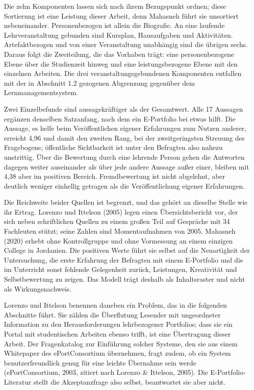 Die zehn Komponenten lassen sich nach ihrem Bezugspunkt ordnen; diese Sortierung ist eine Leistung dieser Arbeit, denn Mahasneh führt sie unsortiert nebeneinander. Personenbezogen ist allein die Biografie. An eine laufende Lehrveranstaltung gebunden sind Kursplan, Hausaufgaben und Aktivitäten. Artefaktbezogen und von einer Veranstaltung unabhängig sind die übrigen sechs. Daraus folgt die Zweiteilung, die das Vorhaben trägt: eine personenbezogene Ebene über die Studienzeit hinweg und eine leistungsbezogene Ebene mit den einzelnen Arbeiten. Die drei veranstaltungsgebundenen Komponenten entfallen mit der in Abschnitt 1.2 gezogenen Abgrenzung gegenüber dem Lernmanagementsystem.

Zwei Einzelbefunde sind aussagekräftiger als der Gesamtwert. Alle 17 Aussagen ergänzen denselben Satzanfang, nach dem ein E-Portfolio bei etwas hilft. Die Aussage, es helfe beim Veröffentlichen eigener Erfahrungen zum Nutzen anderer, erreicht 4,96 und damit den zweiten Rang, bei der zweitgeringsten Streuung des Fragebogens; öffentliche Sichtbarkeit ist unter den Befragten also nahezu unstrittig. Über die Bewertung durch eine lehrende Person gehen die Antworten dagegen weiter auseinander als über jede andere Aussage außer einer, bleiben mit 4,38 aber im positiven Bereich. Fremdbewertung ist nicht abgelehnt, aber deutlich weniger einhellig getragen als die Veröffentlichung eigener Erfahrungen.

Die Reichweite beider Quellen ist begrenzt, und das gehört an dieselbe Stelle wie ihr Ertrag. Lorenzo und Ittelson (2005) legen einen Übersichtsbericht vor, der sich neben schriftlichen Quellen zu einem großen Teil auf Gespräche mit 34 Fachleuten stützt; seine Zahlen sind Momentaufnahmen von 2005. Mahasneh (2020) erhebt ohne Kontrollgruppe und ohne Vormessung an einem einzigen College in Jordanien. Die positiven Werte führt sie selbst auf die Neuartigkeit der Untersuchung, die erste Erfahrung der Befragten mit einem E-Portfolio und die im Unterricht sonst fehlende Gelegenheit zurück, Leistungen, Kreativität und Selbstbewertung zu zeigen. Das Modell trägt deshalb als Inhaltsraster und nicht als Wirkungsnachweis.

Lorenzo und Ittelson benennen daneben ein Problem, das in die folgenden Abschnitte führt. Sie zählen die Überflutung Lesender mit ungeordneter Information zu den Herausforderungen lehrbezogener Portfolios; dass sie ein Portal mit studentischen Arbeiten ebenso trifft, ist eine Übertragung dieser Arbeit. Der Fragenkatalog zur Einführung solcher Systeme, den sie aus einem Whitepaper des ePortConsortium übernehmen, fragt zudem, ob ein System benutzerfreundlich genug für eine leichte Übernahme sein werde (ePortConsortium, 2003, zitiert nach Lorenzo \& Ittelson, 2005). Die E-Portfolio-Literatur stellt die Akzeptanzfrage also selbst, beantwortet sie aber nicht.

